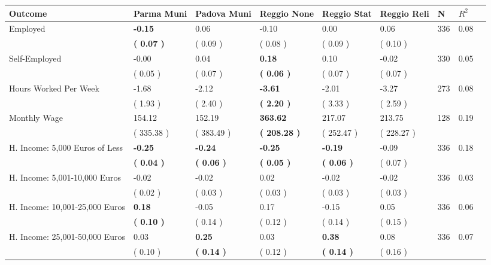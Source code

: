 \begin{tabular}{L{6.2cm} C{1.8cm} C{1.8cm} C{1.8cm} C{1.8cm} C{1.8cm} C{1.8cm} C{0.3cm} C{0.3cm}}
\toprule
 \textbf{Outcome} & \textbf{Parma Muni} & \textbf{Padova Muni} & \textbf{Reggio None} & \textbf{Reggio Stat} & \textbf{Reggio Reli} & \textbf{N} & \textbf{$ R^2$} \\
\midrule
Employed & \textbf{    -0.15} &      0.06 &     -0.10 &      0.00 &      0.06  & 336 &       0.08 \\ 
 & \textbf{(     0.07 )} & (     0.09 ) & (     0.08 ) & (     0.09 ) & (     0.10 )  & \\
Self-Employed &     -0.00 &      0.04 & \textbf{     0.18} &      0.10 &     -0.02  & 330 &       0.05 \\ 
 & (     0.05 ) & (     0.07 ) & \textbf{(     0.06 )} & (     0.07 ) & (     0.07 )  & \\
Hours Worked Per Week &     -1.68 &     -2.12 & \textbf{    -3.61} &     -2.01 &     -3.27  & 273 &       0.08 \\ 
 & (     1.93 ) & (     2.40 ) & \textbf{(     2.20 )} & (     3.33 ) & (     2.59 )  & \\
Monthly Wage &    154.12 &    152.19 & \textbf{   363.62} &    217.07 &    213.75  & 128 &       0.19 \\ 
 & (   335.38 ) & (   383.49 ) & \textbf{(   208.28 )} & (   252.47 ) & (   228.27 )  & \\
H. Income: 5,000 Euros of Less & \textbf{    -0.25} & \textbf{    -0.24} & \textbf{    -0.25} & \textbf{    -0.19} &     -0.09  & 336 &       0.18 \\ 
 & \textbf{(     0.04 )} & \textbf{(     0.06 )} & \textbf{(     0.05 )} & \textbf{(     0.06 )} & (     0.07 )  & \\
H. Income: 5,001-10,000 Euros &     -0.02 &     -0.02 &      0.02 &     -0.02 &     -0.02  & 336 &       0.03 \\ 
 & (     0.02 ) & (     0.03 ) & (     0.03 ) & (     0.03 ) & (     0.03 )  & \\
H. Income: 10,001-25,000 Euros & \textbf{     0.18} &     -0.05 &      0.17 &     -0.15 &      0.05  & 336 &       0.06 \\ 
 & \textbf{(     0.10 )} & (     0.14 ) & (     0.12 ) & (     0.14 ) & (     0.15 )  & \\
H. Income: 25,001-50,000 Euros &      0.03 & \textbf{     0.25} &      0.03 & \textbf{     0.38} &      0.08  & 336 &       0.07 \\ 
 & (     0.10 ) & \textbf{(     0.14 )} & (     0.12 ) & \textbf{(     0.14 )} & (     0.16 )  & \\

\end{tabular}
